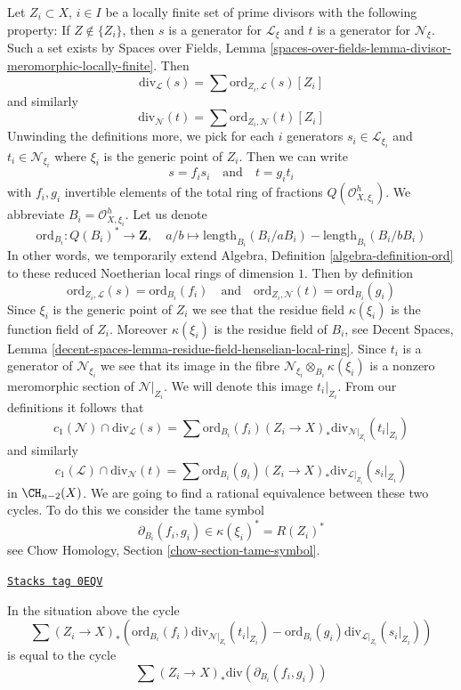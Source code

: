 \medskip\noindent
Let $Z_i \subset X$, $i \in I$ be a locally finite set of prime divisors
with the following property: If $Z \not \in \{Z_i\}$, then $s$ is a
generator for $\mathcal{L}_\xi$ and $t$ is a generator for $\mathcal{N}_\xi$.
Such a set exists by Spaces over Fields, Lemma
\ref{spaces-over-fields-lemma-divisor-meromorphic-locally-finite}.
Then
$$
\text{div}_\mathcal{L}(s) = \sum \text{ord}_{Z_i, \mathcal{L}}(s) [Z_i]
$$
and similarly
$$
\text{div}_\mathcal{N}(t) = \sum \text{ord}_{Z_i, \mathcal{N}}(t) [Z_i]
$$
Unwinding the definitions more, we pick for each $i$ generators
$s_i \in \mathcal{L}_{\xi_i}$ and $t_i \in \mathcal{N}_{\xi_i}$
where $\xi_i$ is the generic point of $Z_i$. Then we can write
$$
s = f_i s_i
\quad\text{and}\quad
t = g_i t_i
$$
with $f_i, g_i$ invertible elements of the total ring of fractions
$Q(\mathcal{O}_{X, \xi_i}^h)$. We abbreviate $B_i = \mathcal{O}_{X, \xi_i}^h$.
Let us denote
$$
\text{ord}_{B_i} : Q(B_i)^* \longrightarrow \mathbf{Z},\quad
a/b \longmapsto
\text{length}_{B_i}(B_i/aB_i) - \text{length}_{B_i}(B_i/bB_i)
$$
In other words, we temporarily extend
Algebra, Definition \ref{algebra-definition-ord}
to these reduced Noetherian local rings of dimension $1$.
Then by definition
$$
\text{ord}_{Z_i, \mathcal{L}}(s) = \text{ord}_{B_i}(f_i)
\quad\text{and}\quad
\text{ord}_{Z_i, \mathcal{N}}(t) = \text{ord}_{B_i}(g_i)
$$
Since $\xi_i$ is the generic point of $Z_i$ we see that
the residue field $\kappa(\xi_i)$ is the function field of $Z_i$.
Moreover $\kappa(\xi_i)$ is the residue field of $B_i$, see
Decent Spaces, Lemma
\ref{decent-spaces-lemma-residue-field-henselian-local-ring}.
Since $t_i$ is a generator of $\mathcal{N}_{\xi_i}$ we see that
its image in the fibre $\mathcal{N}_{\xi_i} \otimes_{B_i} \kappa(\xi_i)$
is a nonzero meromorphic section of $\mathcal{N}|_{Z_i}$. We will denote
this image $t_i|_{Z_i}$. From our definitions it follows that
$$
c_1(\mathcal{N}) \cap \text{div}_\mathcal{L}(s) =
\sum \text{ord}_{B_i}(f_i)
(Z_i \to X)_*\text{div}_{\mathcal{N}|_{Z_i}}(t_i|_{Z_i})
$$
and similarly
$$
c_1(\mathcal{L}) \cap \text{div}_\mathcal{N}(t) =
\sum \text{ord}_{B_i}(g_i)
(Z_i \to X)_*\text{div}_{\mathcal{L}|_{Z_i}}(s_i|_{Z_i})
$$
in $\CH_{n - 2}(X)$. We are going to find a rational equivalence between
these two cycles. To do this we consider the tame symbol
$$
\partial_{B_i}(f_i, g_i) \in \kappa(\xi_i)^* = R(Z_i)^*
$$
see Chow Homology, Section \ref{chow-section-tame-symbol}.

\begin{lemma}

\label{spaces-chow-lemma-key-formula}
\href{https://stacks.math.columbia.edu/tag/0EQV}{\texttt{Stacks tag 0EQV}}

In the situation above the cycle
$$
\sum
(Z_i \to X)_*\left(
\text{ord}_{B_i}(f_i) \text{div}_{\mathcal{N}|_{Z_i}}(t_i|_{Z_i}) -
\text{ord}_{B_i}(g_i) \text{div}_{\mathcal{L}|_{Z_i}}(s_i|_{Z_i}) \right)
$$
is equal to the cycle
$$
\sum (Z_i \to X)_*\text{div}(\partial_{B_i}(f_i, g_i))
$$
\end{lemma}

